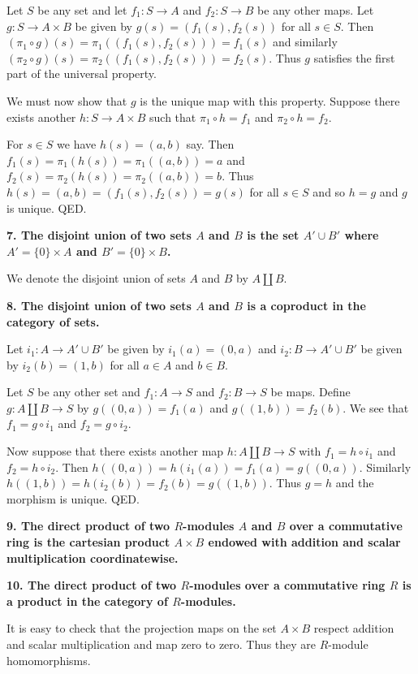 \documentclass[12pt]{article}
\begin{document}
Let $S$ be any set and let $f_1 : S \to A$ and $f_2 : S \to B$ be any other maps. Let $g : S \to A\times B$ be given by $g(s) = (f_1(s), f_2(s))$ for all $s \in S$. Then $(\pi_1\circ g)(s) = \pi_1((f_1(s), f_2(s))) = f_1(s)$ and similarly $(\pi_2\circ g)(s) = \pi_2((f_1(s), f_2(s))) = f_2(s)$. Thus $g$ satisfies the first part of the universal property.

We must now show that $g$ is the unique map with this property. Suppose there exists another $h : S \to A\times B$ such that $\pi_1\circ h = f_1$ and $\pi_2\circ h = f_2$.

For $s \in S$ we have $h(s) = (a, b)$ say. Then $f_1(s) = \pi_1(h(s)) = \pi_1((a, b)) = a$ and $f_2(s) = \pi_2(h(s)) = \pi_2((a, b)) = b$. Thus $h(s) = (a, b) = (f_1(s), f_2(s)) = g(s)$ for all $s \in S$ and so $h = g$ and $g$ is unique. QED.

\textbf{7. The disjoint union of two sets $A$ and $B$ is the set $A'\cup B'$ where $A' = \{0\}\times A$ and $B' = \{0\}\times B$.}

We denote the disjoint union of sets $A$ and $B$ by $A \coprod B$.

\textbf{8. The disjoint union of two sets $A$ and $B$ is a coproduct in the category of sets.}

Let $i_1 : A \to A'\cup B'$ be given by $i_1(a) = (0, a)$ and $i_2 : B \to A'\cup B'$ be given by $i_2(b) = (1, b)$ for all $a \in A$ and $b \in B$.

Let $S$ be any other set and $f_1 : A \to S$ and $f_2 : B \to S$ be maps. Define $g : A\coprod B \to S$ by $g((0, a)) = f_1(a)$ and $g((1, b)) = f_2(b)$. We see that $f_1 = g\circ i_1$ and $f_2 = g\circ i_2$.

Now suppose that there exists another map $h : A\coprod B \to S$ with $f_1 = h\circ i_1$ and $f_2 = h\circ i_2$. Then $h((0, a)) = h(i_1(a)) = f_1(a) = g((0, a))$. Similarly $h((1, b)) = h(i_2(b)) = f_2(b) = g((1, b))$. Thus $g = h$ and the morphism is unique. QED.

\textbf{9. The direct product of two $R$-modules $A$ and $B$ over a commutative ring is the cartesian product $A\times B$ endowed with addition and scalar multiplication coordinatewise.}

\textbf{10. The direct product of two $R$-modules over a commutative ring $R$ is a product in the category of $R$-modules.}

It is easy to check that the projection maps on the set $A\times B$ respect addition and scalar multiplication and map zero to zero. Thus they are $R$-module homomorphisms.
\end{document}
